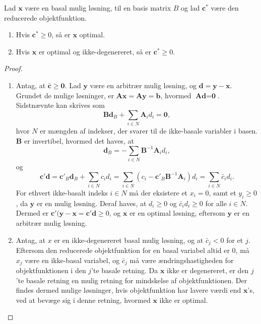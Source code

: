 \begin{thm}{}{}
Lad $\mathbf{x}$ være en basal mulig løsning, til en basis matrix $B$ og lad $\mathbf{c}^*$ være den reducerede objektfunktion. 
\begin{enumerate}[label = (\alph*)]
\item Hvis $\mathbf{c}^* \geq 0$, så er $\mathbf{x}$ optimal.
\item Hvis $\mathbf{x}$ er optimal og ikke-degenereret, så er $\mathbf{c}^* \geq 0$.
\end{enumerate}
\end{thm}
%
\begin{proof}
\begin{enumerate}[label = (\alph*)]
\item Antag, at $\bar{\textbf{c}} \geq \textbf{0}$. Lad $\textbf{y}$ være en arbitrær mulig løsning, og $\textbf{d} = \textbf{y} - \textbf{x}$. Grundet de mulige løsninger, er $\textbf{A} \textbf{x} = \textbf{A} \textbf{y} = \textbf{b}$, hvormed $\textbf{A} \textbf{d} = \textbf{0}$. Sidstnævnte kan skrives som 
$$\textbf{B} \textbf{d}_B + \sum_{i \in N} \textbf{A}_i d_i = \textbf{0},$$
hvor $N$ er mængden af indekser, der svarer til de ikke-basale variabler i basen. %
$\textbf{B}$ er invertibel, hvormed det haves, at 
$$\textbf{d}_B = -\sum_{i \in N} \textbf{B}^{-1} \textbf{A}_i d_i ,$$
og
$$\textbf{c}' \textbf{d} = \textbf{c}'_B \textbf{d}_B + \sum_{i \in N} c_i d_i = \sum_{i \in N} (c_i - \textbf{c}'_B \textbf{B}^{-1} \textbf{A}_i) d_i = \sum_{i \in N} \bar{c}_i d_i .$$
For ethvert ikke-basalt indeks $i \in N$ må der eksistere et $x_i = 0$, samt et $y_i \geq 0$, da $\textbf{y}$ er en mulig løsning. 
Deraf haves, at $d_i \geq 0$ og $\bar{c}_i d_i \geq 0$ for alle $i \in N$. 
Dermed er $\textbf{c}' (\textbf{y} - \textbf{x} = \textbf{c}' \textbf{d} \geq 0$, og $\textbf{x}$ er en optimal løsning, eftersom $\textbf{y}$ er en arbitrær mulig løsning. 
%
%
\item Antag, at $x$ er en ikke-degenereret basal mulig løsning, og at $\bar{c}_j < 0$ for et $j$. Eftersom den reducerede objektfunktion for en basal variabel altid er $0$, må $x_j$ være en ikke-basal variabel, og $\bar{c}_j$ må være ændringshastigheden for objektfunktionen i den $j$'te basale retning. 
Da $\textbf{x}$ ikke er degenereret, er den $j$'te basale retning en mulig retning for mindskelse af objektfunktionen. 
Der findes dermed mulige løsninger, hvis objektfunktion har lavere værdi end $\textbf{x}$'s, ved at bevæge sig i denne retning, hvormed $\textbf{x}$ ikke er optimal. 
\end{enumerate}
\end{proof}
